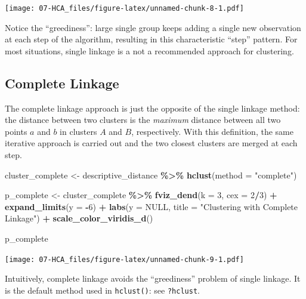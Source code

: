 \documentclass[
]{book}
\newenvironment{Shaded}{\begin{snugshade}}{\end{snugshade}}
\newcommand{\AttributeTok}[1]{\textcolor[rgb]{0.13,0.29,0.53}{#1}}
\newcommand{\ConstantTok}[1]{\textcolor[rgb]{0.56,0.35,0.01}{#1}}
\newcommand{\DecValTok}[1]{\textcolor[rgb]{0.00,0.00,0.81}{#1}}
\newcommand{\FunctionTok}[1]{\textcolor[rgb]{0.13,0.29,0.53}{\textbf{#1}}}
\newcommand{\NormalTok}[1]{#1}
\newcommand{\OtherTok}[1]{\textcolor[rgb]{0.56,0.35,0.01}{#1}}
\newcommand{\SpecialCharTok}[1]{\textcolor[rgb]{0.81,0.36,0.00}{\textbf{#1}}}
\newcommand{\StringTok}[1]{\textcolor[rgb]{0.31,0.60,0.02}{#1}}
\begin{document}
\texttt{[image: 07-HCA\_files/figure-latex/unnamed-chunk-8-1.pdf]}

Notice the ``greediness'': large single group keeps adding a single new observation at each step of the algorithm, resulting in this characteristic ``step'' pattern. For most situations, single linkage is a not a recommended approach for clustering.

\subsection{Complete Linkage}\label{complete-linkage}

The complete linkage approach is just the opposite of the single linkage method: the distance between two clusters is the \emph{maximum} distance between all two points \(a\) and \(b\) in clusters \(A\) and \(B\), respectively. With this definition, the same iterative approach is carried out and the two closest clusters are merged at each step.

\begin{Shaded}
\begin{Highlighting}[]
\NormalTok{cluster\_complete }\OtherTok{\textless{}{-}} 
\NormalTok{  descriptive\_distance }\SpecialCharTok{\%\textgreater{}\%}
  \FunctionTok{hclust}\NormalTok{(}\AttributeTok{method =} \StringTok{"complete"}\NormalTok{)}

\NormalTok{p\_complete }\OtherTok{\textless{}{-}}
\NormalTok{  cluster\_complete }\SpecialCharTok{\%\textgreater{}\%}
  \FunctionTok{fviz\_dend}\NormalTok{(}\AttributeTok{k =} \DecValTok{3}\NormalTok{, }\AttributeTok{cex =} \DecValTok{2}\SpecialCharTok{/}\DecValTok{3}\NormalTok{) }\SpecialCharTok{+} 
  \FunctionTok{expand\_limits}\NormalTok{(}\AttributeTok{y =} \SpecialCharTok{{-}}\DecValTok{6}\NormalTok{) }\SpecialCharTok{+} 
  \FunctionTok{labs}\NormalTok{(}\AttributeTok{y =} \ConstantTok{NULL}\NormalTok{, }\AttributeTok{title =} \StringTok{"Clustering with Complete Linkage"}\NormalTok{) }\SpecialCharTok{+}
  \FunctionTok{scale\_color\_viridis\_d}\NormalTok{()}

\NormalTok{p\_complete}
\end{Highlighting}
\end{Shaded}

\texttt{[image: 07-HCA\_files/figure-latex/unnamed-chunk-9-1.pdf]}

Intuitively, complete linkage avoids the ``greediness'' problem of single linkage. It is the default method used in \texttt{hclust()}: see \texttt{?hclust}.
\end{document}
